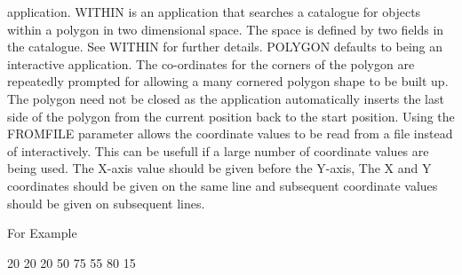 \begin{small}
{{       application. WITHIN is an application that searches a
       catalogue for objects  within a polygon in two dimensional space.
       The space is defined by two fields in the catalogue. See
       WITHIN for further details.
       POLYGON defaults to being an interactive application. The co-ordinates
       for the corners of the polygon are repeatedly prompted for
       allowing a many cornered polygon shape to be built up. The
       polygon need not be closed as the application automatically
       inserts the last side of the polygon from the current position
       back to the start position.
       Using the FROMFILE parameter allows the coordinate values to be read
       from a file instead of interactively. This can be usefull if a large
       number of coordinate values are being used. The X-axis value should be
       given before the Y-axis, The X and Y coordinates should be given on the
       same line and subsequent coordinate values should be given on subsequent
       lines.

       For Example

       20   20
      20    50
         75   55
      80   15
   }
}
\end{small}
